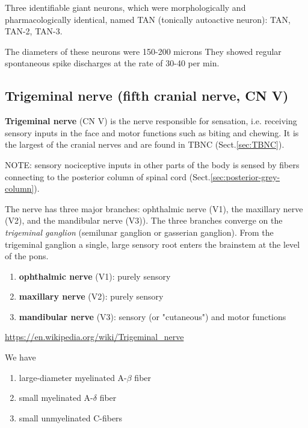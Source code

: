 Three identifiable giant neurons, which were morphologically and
pharmacologically identical, named TAN (tonically autoactive neuron): TAN,
TAN-2, TAN-3.

The diameters of these neurons were 150-200 microns They showed regular
spontaneous spike discharges at the rate of 30-40 per min.


\subsection{Trigeminal nerve (fifth cranial nerve, CN V)}
\label{sec:trigeminal-nerve}


{\bf Trigeminal nerve} (CN V) is the nerve responsible for sensation, i.e.
receiving sensory inputs in the face and motor functions such as biting and
chewing. It is the largest of the cranial nerves and are found in TBNC
(Sect.\ref{sec:TBNC}). 

\begin{mdframed}

NOTE: sensory nociceptive inputs in other parts of the body is sensed by fibers
connecting to the posterior column of spinal cord
(Sect.\ref{sec:posterior-grey-column}).

\end{mdframed}


The nerve has three major branches: ophthalmic nerve (V1), the maxillary nerve
(V2), and the mandibular nerve (V3)). The three branches converge on the
{\it trigeminal ganglion} (semilunar ganglion or gasserian ganglion).
From the trigeminal ganglion a single, large sensory root enters the brainstem
at the level of the pons.

\begin{enumerate}
  \item {\bf ophthalmic nerve} (V1): purely sensory
  
  \item {\bf maxillary nerve} (V2): purely sensory
  
  \item {\bf mandibular nerve} (V3): sensory (or "cutaneous") and motor
  functions
\end{enumerate}
\url{https://en.wikipedia.org/wiki/Trigeminal_nerve}

We have
\begin{enumerate}
  \item large-diameter myelinated A-$\beta$ fiber
  
  \item small myelinated A-$\delta$ fiber
  
  \item small unmyelinated C-fibers
\end{enumerate}


